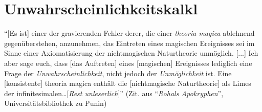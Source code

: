 \chapter[tocentry=Unwahrscheinlichkeitskalkül, head=Unwahrscheinlichkeitskalkül]{Unwahrscheinlichkeitskalk\uech l}
"`[Es ist] einer der gravierenden Fehler derer, die einer \emph{theoria magica} ablehnend gegenüberstehen, anzunehmen, das Eintreten eines magischen Ereignisses sei im Sinne einer Axiomatisierung der nichtmagischen Naturtheorie unmöglich. [...] Ich aber sage euch, dass [das Auftreten] eines [magischen] Ereignisses lediglich eine Frage der \emph{Unwahrscheinlichkeit}, nicht jedoch der \emph{Unmöglichkeit} ist. Eine [konsistente] theoria magica enthält die [nichtmagische Naturtheorie] als Limes der infinitesimalen\ldots [\textit{Rest unleserlich}]"' (Zit. aus "`\emph{Rohals Apokryphen}"', Universitätsbibliothek zu Punin)

